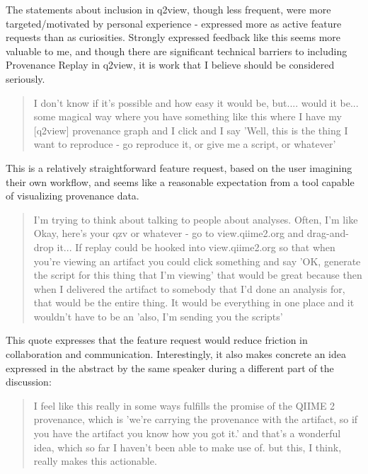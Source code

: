The statements about inclusion in q2view, though less frequent, were more
targeted/motivated by personal experience - expressed more as active feature
requests than as curiosities. Strongly expressed feedback like this seems more
valuable to me, and though there are significant technical barriers to including
Provenance Replay in q2view, it is work that I believe should be considered
seriously. 

\begin{quote}
I don't know if it's possible and how easy it would be, but.... would it be...
some magical way where you have something like this where I have my [q2view]
provenance graph and I click and I say 'Well, this is the thing I want to
reproduce - go reproduce it, or give me a script, or whatever'
\end{quote}

\noindent This is a relatively straightforward feature request, based on the user
imagining their own workflow, and seems like a reasonable expectation from a
tool capable of visualizing provenance data.

\begin{quote}
I'm trying to think about talking to people about analyses. Often, I'm like
Okay, here's your qzv or whatever - go to view.qiime2.org and drag-and-drop
it... If replay could be hooked into view.qiime2.org so that when you're viewing
an artifact you could click something and say 'OK, generate the script for this
thing that I'm viewing' that would be great because then when I delivered the
artifact to somebody that I'd done an analysis for, that would be the entire
thing. It would be everything in one place and it wouldn't have to be an 'also,
I'm sending you the scripts'
\end{quote}

\noindent This quote expresses that the feature request would reduce friction in
collaboration and communication. Interestingly, it also makes concrete an idea
expressed in the abstract by the same speaker during a different part of the
discussion:

\begin{quote}
I feel like this really in some ways fulfills the promise of the QIIME 2
provenance, which is 'we're carrying the provenance with the artifact, so if you
have the artifact you know how you got it.' and that's a wonderful idea, which
so far I haven't been able to make use of. but this, I think, really makes this
actionable.
\end{quote}

